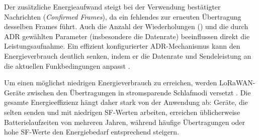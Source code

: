 	Der zusätzliche Energieaufwand steigt bei der Verwendung bestätigter Nachrichten (\textit{Confirmed Frames}), da ein fehlendes  zur erneuten Übertragung desselben Frames führt. Auch die Anzahl der Wiederholungen () und die durch ADR gewählten Parameter (insbesondere die Datenrate) beeinflussen direkt die Leistungsaufnahme. Ein effizient konfigurierter ADR-Mechanismus kann den Energieverbrauch deutlich senken, indem er die Datenrate und Sendeleistung an die aktuellen Funkbedingungen anpasst \cite{LoRaAlliance:2020b}.

	Um einen möglichst niedrigen Energieverbrauch zu erreichen, werden LoRaWAN-Geräte zwischen den Übertragungen in stromsparende Schlafmodi versetzt \cite{Semtech:2024}. Die gesamte Energieeffizienz hängt daher stark von der Anwendung ab: Geräte, die selten senden und mit niedrigen SF-Werten arbeiten, erreichen üblicherweise Batterielaufzeiten von mehreren Jahren, während häufige Übertragungen oder hohe SF-Werte den Energiebedarf entsprechend steigern.



